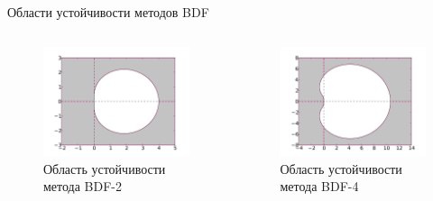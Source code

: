 \documentclass[ignoreonframetext,unicode]{beamer}
\begin{document}
\begin{frame}{Области устойчивости методов BDF}
	
	\begin{columns}
		\begin{figure}[!htbp]
			\centering
			\includegraphics[width=1\textwidth]{330px-Stability_region_for_BDF2}%
			\caption{Область устойчивости метода BDF-2}
			\vspace*{-2mm}
			\label{ser_graph}
		\end{figure}
		\begin{figure}[!htbp]
			\centering
			\includegraphics[width=1\textwidth]{330px-Stability_region_for_BDF4}%
			\caption{Область устойчивости метода BDF-4}
			\vspace*{-2mm}
			\label{ser_graph}
		\end{figure}
	\end{columns}

\end{frame}	
\end{document}
